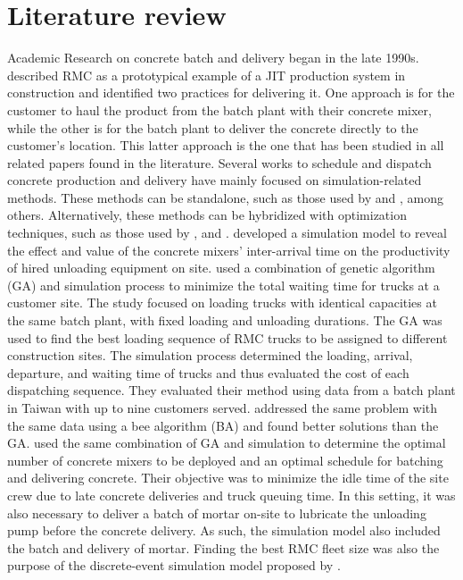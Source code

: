 \section{Literature review}
\label{sec:cdp_lit_review}

Academic Research on concrete batch and delivery began in the late 1990s. \cite{tommelein1999just} described RMC as a prototypical example of a JIT production system in construction and identified two practices for delivering it. One approach is for the customer to haul the product from the batch plant with their concrete mixer, while the other is for the batch plant to deliver the concrete directly to the customer's location. This latter approach is the one that has been studied in all related papers found in the literature. Several works to schedule and dispatch concrete production and delivery have mainly focused on simulation-related methods. These methods can be standalone, such as those used by \cite{zayed2001simulation, wang2001scheduling, tian_simulation_based_2010, panas_simulation_based_2013} and \cite{galic2016simulation}, among others. Alternatively, these methods can be hybridized with optimization techniques, such as those used by \cite{feng2004optimizing, lu2005optimized}, and \cite{feng_integrating_2006}. \cite{wang2001scheduling} developed a simulation model to reveal the effect and value of the concrete mixers' inter-arrival time on the productivity of hired unloading equipment on site. \cite{feng2004optimizing} used a combination of genetic algorithm (GA) and simulation process to minimize the total waiting time for trucks at a customer site. The study focused on loading trucks with identical capacities at the same batch plant, with fixed loading and unloading durations. The GA was used to find the best loading sequence of RMC trucks to be assigned to different construction sites. The simulation process determined the loading, arrival, departure, and waiting time of trucks and thus evaluated the cost of each dispatching sequence. They evaluated their method using data from a batch plant in Taiwan with up to nine customers served. \cite{mayteekrieangkrai2015optimized} addressed the same problem with the same data using a bee algorithm (BA) and found better solutions than the GA. \cite{lu2005optimized} used the same combination of GA and simulation to determine the optimal number of concrete mixers to be deployed and an optimal schedule for batching and delivering concrete. Their objective was to minimize the idle time of the site crew due to late concrete deliveries and truck queuing time. In this setting, it was also necessary to deliver a batch of mortar on-site to lubricate the unloading pump before the concrete delivery. As such, the simulation model also included the batch and delivery of mortar. Finding the best RMC fleet size was also the purpose of the discrete-event simulation model proposed by \cite{panas_simulation_based_2013}.

